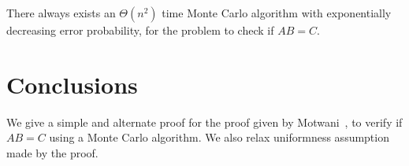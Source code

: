 \documentclass[runningheads]{llncs}
\begin{document}
\begin{corollary}
There always exists an $\Theta(n^2)$ time Monte Carlo algorithm with exponentially decreasing error probability, for the
problem to check if $AB=C$. 
\end{corollary}

\section{Conclusions}
We give a simple and alternate proof for the proof given by Motwani~\cite{motwani1995}, to verify if $AB = C$
using a Monte Carlo algorithm. We also relax uniformness assumption made by the proof.



\end{document}
